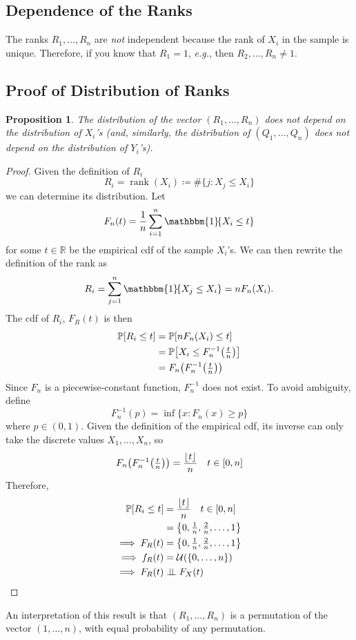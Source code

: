 \documentclass[letterpaper, reqno]{amsart}
\newtheorem{prop}{Proposition}[section]
\numberwithin{equation}{section}
\DeclarePairedDelimiter{\floor}{\lfloor}{\rfloor}
\newcommand{\Prob}[1]{\mathbb{P}\mleft[#1\mright]}
\newcommand{\R}{\mathbb{R}}  %
\newcommand{\indep}{\perp \!\!\! \perp}  %
\newcommand{\indic}[1]{\mathbbm{1}\!\mleft\{#1\mright\}} %
\newcommand{\sumi}[2]{\sum_{#1=1}^{#2}}
\newcommand{\avg}[2]{\frac{1}{#2}\sumi{#1}{#2}}
\begin{document}
\subsection{Dependence of the Ranks}
The ranks $R_1, \dots, R_n$ are \emph{not} independent because the rank of $X_i$
in the sample is unique. Therefore, if you know that $R_1 = 1$, \emph{e.g.}, then
$R_2,\dots,R_n \ne 1$.

\subsection{Proof of Distribution of Ranks} \label{subsec:3}
\begin{prop}
  The distribution of the vector $(R_1, \dots, R_n)$ does \emph{not} depend on
  the distribution of $X_i$'s (and, similarly, the distribution of $(Q_1,
  \dots, Q_n)$ does not depend on the distribution of $Y_i$'s).
\end{prop}

\begin{proof}
  Given the definition of $R_i$
  \[ R_i = \operatorname{rank}(X_i) \coloneqq \#\{j \colon X_j \le X_i\} \]
  we can determine its distribution.
  Let
  \[ F_n(t) = \avg{i}{n} \indic{X_i \le t} \]
  for some $t \in \R$ be the empirical cdf of the sample $X_i$'s.
  We can then rewrite the definition of the rank as
  \[ R_i = \sumi{j}{n} \indic{X_j \le X_i} = n F_n(X_i). \]
  The cdf of $R_i$, $F_R(t)$ is then
  \begin{align*}
    \Prob{R_i \le t} &= \Prob{n F_n(X_i) \le t} \\
                     &= \Prob{X_i \le F_n^{-1}\mleft(\tfrac{t}{n}\mright)} \\
                     &= F_n\mleft(F_n^{-1}\mleft(\tfrac{t}{n}\mright)\mright)
  \end{align*}
  Since $F_n$ is a piecewise-constant function, $F_n^{-1}$ does not exist. To
  avoid ambiguity, define
  \[ F_n^{-1}(p) = \inf\{x \colon F_n(x) \ge p\} \]
  where $p \in (0, 1)$. Given the definition of the empirical cdf, its inverse
  can only take the discrete values $X_1, \dots, X_n$, so
  \[  F_n\mleft(F_n^{-1}\mleft(\tfrac{t}{n}\mright)\mright)
      = \frac{\floor{t}}{n} \quad t \in [0, n] \]
  Therefore,
  \begin{align*}
    \Prob{R_i \le t} &= \frac{\floor{t}}{n} \quad t \in [0, n] \\
                    &= \mleft\{0, \tfrac{1}{n}, \tfrac{2}{n}, \dots, 1\mright\} \\
    \implies F_R(t) &= \mleft\{0, \tfrac{1}{n}, \tfrac{2}{n}, \dots, 1\mright\} \\
    \implies f_R(t) &= \mathcal{U}(\{0,\dots,n\}) \\
    \implies F_R(t) &\indep F_X(t) \qedhere
  \end{align*}
\end{proof}
An interpretation of this result is that $(R_1, \dots, R_n)$ is a permutation of
the vector $(1, \dots, n)$, with equal probability of any permutation.
\end{document}
